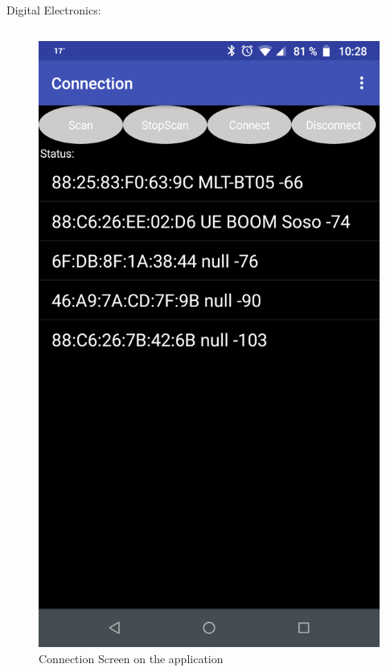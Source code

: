 \documentclass{beamer}
\begin{document}
\begin{frame}{Digital Electronics:}
\begin{columns}[T]
\begin{column}{0.5\textwidth}
\begin{figure}
	    			\hspace*{2em}\includegraphics[height=0.8\textheight]{../Illus/AppConnection.png}
	    			\caption{Connection Screen on the application}
	    		\end{figure}
	  		\end{column}
		\end{columns}
		
	\end{frame}
\end{document}

